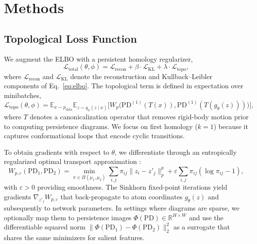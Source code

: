 \documentclass[11pt]{article}
\begin{document}
\section{Methods}
\subsection{Topological Loss Function}
We augment the ELBO with a persistent homology regularizer,
\begin{equation}
    \mathcal{L}_{\text{total}}(\theta, \phi) = \mathcal{L}_{\text{recon}} + \beta \cdot \mathcal{L}_{\text{KL}} + \lambda \cdot \mathcal{L}_{\text{topo}},
    \label{eq:total_loss}
\end{equation}
where $\mathcal{L}_{\text{recon}}$ and $\mathcal{L}_{\text{KL}}$ denote the reconstruction and Kullback--Leibler components of Eq.~\eqref{eq:elbo}. The topological term is defined in expectation over minibatches,
\begin{equation}
    \mathcal{L}_{\text{topo}}(\theta, \phi) = \mathbb{E}_{x \sim p_{\text{data}}} \mathbb{E}_{z \sim q_\phi(z \mid x)} \big[ W_p\big( \mathrm{PD}^{(1)}(T(x)), \mathrm{PD}^{(1)}(T(g_\theta(z))) \big) \big],
    \label{eq:topo-loss}
\end{equation}
where $T$ denotes a canonicalization operator that removes rigid-body motion prior to computing persistence diagrams. We focus on first homology ($k=1$) because it captures conformational loops that encode cyclic transitions.

To obtain gradients with respect to $\theta$, we differentiate through an entropically regularized optimal transport approximation \cite{cuturi2013sinkhorn}:
\begin{equation}
    W_{p, \varepsilon}(\mathrm{PD}_1, \mathrm{PD}_2) = \min_{\pi \in \Pi(\mu_1, \mu_2)} \sum_{i,j} \pi_{ij} \| z_i - z'_j \|_p^p + \varepsilon \sum_{i,j} \pi_{ij} (\log \pi_{ij} - 1),
    \label{eq:entropic-wasserstein}
\end{equation}
with $\varepsilon > 0$ providing smoothness. The Sinkhorn fixed-point iterations yield gradients $\nabla_{z'_j} W_{p, \varepsilon}$ that back-propagate to atom coordinates $g_\theta(z)$ and subsequently to network parameters. In settings where diagrams are sparse, we optionally map them to persistence images $\Phi(\mathrm{PD}) \in \mathbb{R}^{H \times W}$ and use the differentiable squared norm $\| \Phi(\mathrm{PD}_1) - \Phi(\mathrm{PD}_2) \|_2^2$ \cite{adams2017persistence} as a surrogate that shares the same minimizers for salient features.
\end{document}
